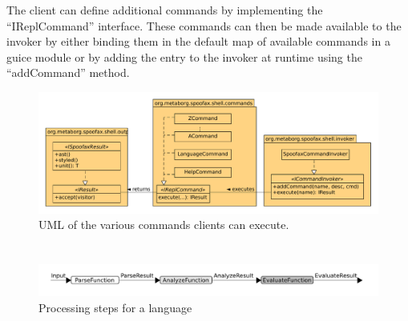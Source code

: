 The client can define additional commands by implementing the ``IReplCommand''
interface. These commands can then be made available to the invoker by either
binding them in the default map of available commands in a guice module or by
adding the entry to the invoker at runtime using the ``addCommand'' method.

\begin{figure}[h]
  \centering
  \includegraphics[width=\textwidth]{uml-commands}
  \caption{UML of the various commands clients can execute.}
  \label{fig:uml-commands}
\end{figure}

\section{}
\label{sec:function-comp}

\begin{figure}[h]
  \includegraphics[width=\textwidth]{unit-flow}
  \caption{Processing steps for a language }
  \label{fig:unit-flow}
\end{figure}

\section{}
\label{sec:visitor}

\section{}
\label{sec:eval-strat}

